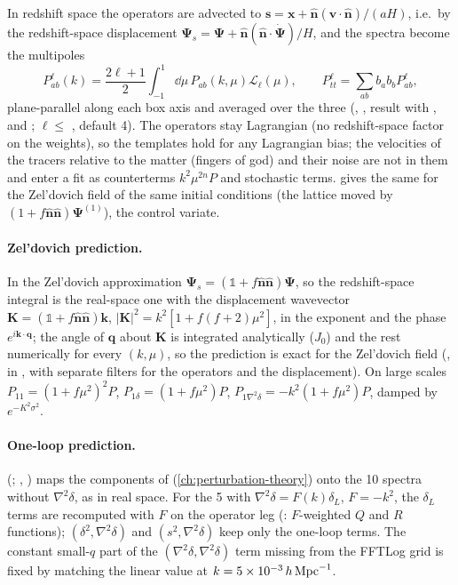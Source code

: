 In redshift space the operators are advected to $\bm s=\bm x+\hat{\bm n}(\bm v\cdot\hat{\bm n})/(aH)$, i.e.\ by the redshift-space
displacement $\bm\Psi_s=\bm\Psi+\hat{\bm n}(\hat{\bm n}\cdot\dot{\bm\Psi})/H$, and the spectra become the multipoles
\begin{equation}
P^\ell_{ab}(k)=\frac{2\ell+1}{2}\int_{-1}^1\dd\mu\,P_{ab}(k,\mu)\mathcal L_\ell(\mu),\qquad
P^\ell_{tt}=\sum_{ab}b_ab_bP^\ell_{ab},
\end{equation}
plane-parallel along each box axis and averaged over the three (,
, result  with ,  and
; $\ell\le$ , default 4). The operators stay Lagrangian (no redshift-space factor on the weights), so
the templates hold for any Lagrangian bias; the velocities of the tracers relative to the matter (fingers of god) and their noise
are not in them and enter a fit as counterterms $k^2\mu^{2n}P$ and stochastic terms.
 gives the same for the Zel'dovich field of the same initial conditions (the
lattice moved by $(1+f\hat{\bm n}\hat{\bm n})\bm\Psi^{(1)}$), the control variate.

\paragraph*{Zel'dovich prediction.} In the Zel'dovich approximation $\bm\Psi_s=(\mathbb 1+f\hat{\bm n}\hat{\bm n})\bm\Psi$,
so the redshift-space integral is the real-space one with the displacement wavevector $\bm K=(\mathbb 1+f\hat{\bm n}\hat{\bm n})\bm k$,
$|\bm K|^2=k^2[1+f(f+2)\mu^2]$, in the exponent and the phase $e^{i\bm k\cdot\bm q}$; the angle of $\bm q$ about $\bm K$ is
integrated analytically ($J_0$) and the rest numerically for every $(k,\mu)$, so the prediction is exact for the Zel'dovich field
(,  in , with separate filters for the
operators and the displacement). On large scales $P_{11}=(1+f\mu^2)^2P$, $P_{1\delta}=(1+f\mu^2)P$,
$P_{1\nabla^2\delta}=-k^2(1+f\mu^2)P$, damped by $e^{-K^2\sigma^2}$.

\paragraph*{One-loop prediction.}  (; ,
) maps the components of  (\cref{ch:perturbation-theory}) onto the 10 spectra
without $\nabla^2\delta$, as in real space. For the 5 with $\nabla^2\delta=F(k)\delta_L$, $F=-k^2$, the $\delta_L$ terms are
recomputed with $F$ on the operator leg (: $F$-weighted $Q$ and $R$ functions);
$(\delta^2,\nabla^2\delta)$ and $(s^2,\nabla^2\delta)$ keep only the one-loop terms. The constant small-$q$ part of the
$(\nabla^2\delta,\nabla^2\delta)$ term missing from the FFTLog grid is fixed by matching the linear value at $k=5\times10^{-3}\,h\,\mathrm{Mpc}^{-1}$.

